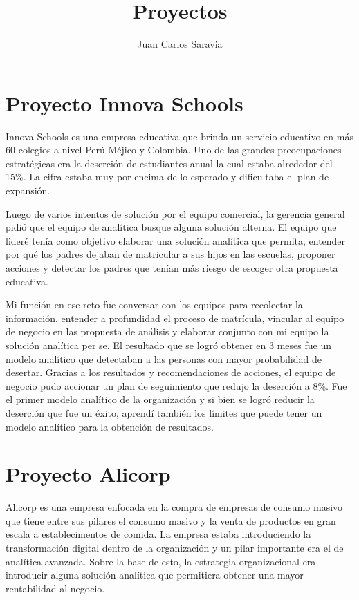 \documentclass{article}
\date{}%
\begin{document}
\title{Proyectos} \author{Juan Carlos Saravia}

\maketitle

\section*{Proyecto Innova Schools}

Innova Schools es una empresa educativa que brinda un servicio educativo en más 60 colegios a nivel Perú Méjico y Colombia. Uno de las grandes preocupaciones estratégicas era la deserción de estudiantes anual la cual estaba alrededor del 15\%. La cifra estaba muy por encima de lo esperado y dificultaba el plan de expansión. 

Luego de varios intentos de solución por el equipo comercial, la gerencia general pidió que el equipo de analítica busque alguna solución alterna. El equipo que lideré tenía como objetivo elaborar una solución analítica que permita, entender por qué los padres dejaban de matricular a sus hijos en las escuelas, proponer acciones y detectar los padres que tenían más riesgo de escoger otra propuesta educativa. 

Mi función en ese reto fue conversar con los equipos para recolectar la información, entender a profundidad el proceso de matrícula, vincular al equipo de negocio en las propuesta de análisis y elaborar conjunto con mi equipo la solución analítica per se. El resultado que se logró obtener en 3 meses fue un modelo analítico que detectaban a las personas con mayor probabilidad de desertar. Gracias a los resultados y recomendaciones de acciones, el equipo de negocio pudo accionar un plan de seguimiento que redujo la deserción a 8\%. Fue el primer modelo analítico de la organización y si bien se logró reducir la deserción que fue un éxito, aprendí también los límites que puede tener un modelo analítico para la obtención de resultados. 


\section*{Proyecto Alicorp}

Alicorp es una empresa enfocada en la compra de empresas de consumo masivo que tiene entre sus pilares el consumo masivo y la venta de productos en gran escala a establecimentos de comida. La empresa estaba introduciendo la transformación digital dentro de la organización y un pilar importante era el de analítica avanzada. Sobre la base de esto, la estrategia organizacional era introducir alguna solución analítica que permitiera obtener una mayor rentabilidad al negocio. 
\end{document}

